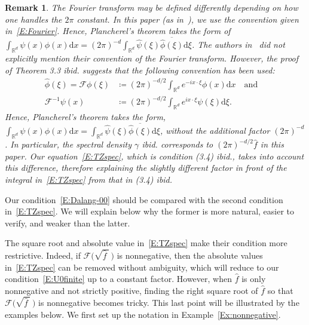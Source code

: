 \documentclass[sn-mathphys]{sn-jnl}%
\newcommand{\BR}{\mathbb{R}}
\newcommand{\ud}{\ensuremath{\mathrm{d}}}
\numberwithin{equation}{section}
\theoremstyle{thmstyleone}%
\theoremstyle{thmstyletwo}%
\newtheorem{remark}{Remark}[section]%
\theoremstyle{thmstylethree}%
\begin{document}
\begin{remark}\label{R:Fourier}
  The Fourier transform may be defined differently depending on how one handles the $2\pi$ constant.
  In this paper (as in~\cite{chen.kim:19:nonlinear,chen.huang:19:comparison}), we use the convention
  given in~\eqref{E:Fourier}. Hence, Plancherel's theorem takes the form of $\int_{\BR^d} \psi(x)
  \phi(x)\ud x = (2\pi)^{-d} \int_{\BR^d} \widehat{\psi}(\xi) \overline{\widehat{\phi}(\xi)}\ud \xi$.
  The authors in~\cite{tessitore.zabczyk:98:invariant} did not explicitly mention their convention
  of the Fourier transform. However, the proof of Theorem 3.3 \textit{ibid.} suggests that the
  following convention has been used:
	\begin{align*}
    \widehat{\phi}(\xi) = \mathcal{F}\phi(\xi) & \coloneqq (2\pi)^{-d/2} \int_{\BR^d} e^{-i x\cdot\xi} \phi(x)\ud x \quad \text{and} \quad \\
    \mathcal{F}^{-1}\psi(x)                    & \coloneqq (2\pi)^{-d/2} \int_{\BR^d} e^{i x\cdot\xi} \psi(\xi)\ud \xi.
	\end{align*}
  Hence, Plancherel's theorem takes the form, $\int_{\BR^d} \psi(x) \phi(x)\ud x = \int_{\BR^d}
  \widehat{\psi}(\xi) \overline{\widehat{\phi}(\xi)}\ud \xi$, without the additional factor
  $(2\pi)^{-d}$. In particular, the spectral density $\gamma$ \textit{ibid.} corresponds to
  $\left(2\pi\right)^{-d/2}\widehat{f}$ in this paper. Our equation~\eqref{E:TZspec}, which is
  condition (3.4) \textit{ibid.}, takes into account this difference, therefore explaining the
  slightly different factor in front of the integral in~\eqref{E:TZspec} from that in (3.4)
  \textit{ibid.}
\end{remark}

Our condition~\eqref{E:Dalang-00} should be compared with the second condition in~\eqref{E:TZspec}.
We will explain below why the former is more natural, easier to verify, and weaker than the latter.

%
The square root and absolute value in~\eqref{E:TZspec} make their condition more restrictive.
Indeed, if $\mathcal{F}\big(\sqrt{\widehat{f}\:}\:\big)$ is nonnegative, then the absolute values
in~\eqref{E:TZspec} can be removed without ambiguity, which will reduce to our
condition~\eqref{E:U0finite} up to a constant factor. However, when $\widehat{f}$ is only
nonnegative and not strictly positive, finding the right square root of $\widehat{f}$ so that
$\mathcal{F}\big(\sqrt{\widehat{f}\:}\:\big)$ is nonnegative becomes tricky. This last point will be
illustrated by the examples below. We first set up the notation in Example~\ref{Ex:nonnegative}.
%
%
\end{document}
